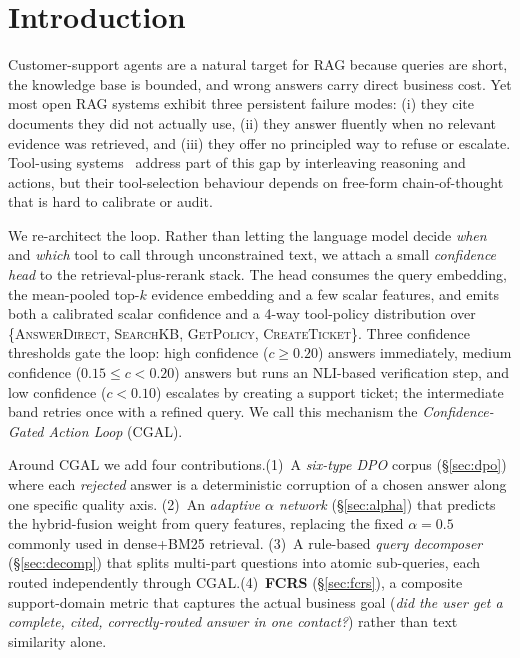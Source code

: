 \documentclass[11pt,a4paper,twocolumn]{article}
\begin{document}
\section{Introduction}\label{sec:intro}

Customer-support agents are a natural target for RAG because queries are
short, the knowledge base is bounded, and wrong answers carry direct
business cost. Yet most open RAG systems exhibit three persistent
failure modes: (i) they cite documents they did not actually use, (ii)
they answer fluently when no relevant evidence was retrieved, and (iii)
they offer no principled way to refuse or escalate. Tool-using systems~\cite{react,toolllm}
address part of this gap by interleaving reasoning
and actions, but their tool-selection behaviour depends on free-form
chain-of-thought that is hard to calibrate or audit.

We re-architect the loop. Rather than letting the language model decide
\emph{when} and \emph{which} tool to call through unconstrained text, we
attach a small \emph{confidence head} to the retrieval-plus-rerank stack.
The head consumes the query embedding, the mean-pooled top-$k$ evidence
embedding and a few scalar features, and emits both a calibrated scalar
confidence and a 4-way tool-policy distribution over
\{\textsc{AnswerDirect}, \textsc{SearchKB}, \textsc{GetPolicy},
\textsc{CreateTicket}\}. Three confidence thresholds gate the loop: high
confidence ($c\geq0.20$) answers immediately, medium confidence
($0.15\leq c<0.20$) answers but runs an NLI-based verification step, and
low confidence ($c<0.10$) escalates by creating a support ticket; the
intermediate band retries once with a refined query. We call this
mechanism the \emph{Confidence-Gated Action Loop} (CGAL).

Around CGAL we add four contributions.\@ (1)~A \emph{six-type DPO} corpus
(\S\ref{sec:dpo}) where each \textit{rejected} answer is a deterministic
corruption of a chosen answer along one specific quality axis. (2)~An
\emph{adaptive $\alpha$ network} (\S\ref{sec:alpha}) that predicts the
hybrid-fusion weight from query features, replacing the fixed
$\alpha=0.5$ commonly used in dense+BM25 retrieval. (3)~A rule-based
\emph{query decomposer} (\S\ref{sec:decomp}) that splits multi-part
questions into atomic sub-queries, each routed independently through
CGAL.\@ (4)~\textbf{FCRS} (\S\ref{sec:fcrs}), a composite support-domain
metric that captures the actual business goal (\textit{did the user get
a complete, cited, correctly-routed answer in one contact?}) rather than
text similarity alone.
\end{document}
